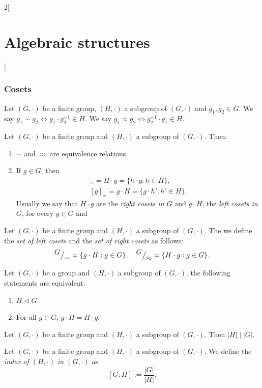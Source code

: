 \documentclass[class=article,10pt,crop=false]{standalone}
\begin{document}
\begin{multicols}{2}[\section{Algebraic structures}]
\subsubsection*{Cosets}
\begin{definition}
Let $(G,\cdot)$ be a finite group, $(H,\cdot)$ a subgroup of $(G,\cdot)$ and $g_1,g_2\in G$. We say $g_1\sim g_2\iff g_1\cdot g_2^{-1}\in H$. We say $g_1\approx g_2\iff g_2^{-1}\cdot g_1\in H$.
\end{definition}
\begin{lemma}
Let $(G,\cdot)$ be a finite group and $(H,\cdot)$ a subgroup of $(G,\cdot)$. Then:
\begin{enumerate}
    \item $\sim$ and $\approx$ are equivalence relations.
    \item If $g\in G$, then 
    \begin{gather*}
        [g]_\sim=H\cdot g=\{h\cdot g:h\in H\},\\ [g]_\approx=g\cdot H=\{g\cdot h':h'\in H\}.
    \end{gather*}
    Usually we say that $H\cdot g$ are the \textit{right cosets in $G$} and $g\cdot H$, the \textit{left cosets in $G$}, for every $g\in G$ and 
\end{enumerate}
\end{lemma}
\begin{definition}
Let $(G,\cdot)$ be a finite group and $(H,\cdot)$ a subgroup of $(G,\cdot)$. The we define the \textit{set of left cosets} and the \textit{set of right cosets} as follows:
$${^{\textstyle G}\big/_{\textstyle \sim}}=\{g\cdot H:g\in G\},\quad{^{\textstyle G}\big/_{\textstyle \approx}}=\{H\cdot g:g\in G\}.$$
\end{definition}
\begin{prop}
Let $(G,\cdot)$ be a group and $(H,\cdot)$ a subgroup of $(G,\cdot)$. the following statements are equivalent:
\begin{enumerate}
    \item $H\lhd G$.
    \item For all $g\in G$, $g\cdot H=H\cdot g$.
\end{enumerate}
\end{prop}
\begin{theorem}
Let $(G,\cdot)$ be a finite group and $(H,\cdot)$ a subgroup of $(G,\cdot)$. Then $|H|\mid|G|$.
\end{theorem}
\begin{definition}
Let $(G,\cdot)$ be a finite group and $(H,\cdot)$ a subgroup of $(G,\cdot)$. We define the \textit{index of $(H,\cdot)$ in $(G,\cdot)$} as $$[G:H]:=\frac{|G|}{|H|}.$$

\end{definition}
\end{multicols}
\end{document}

